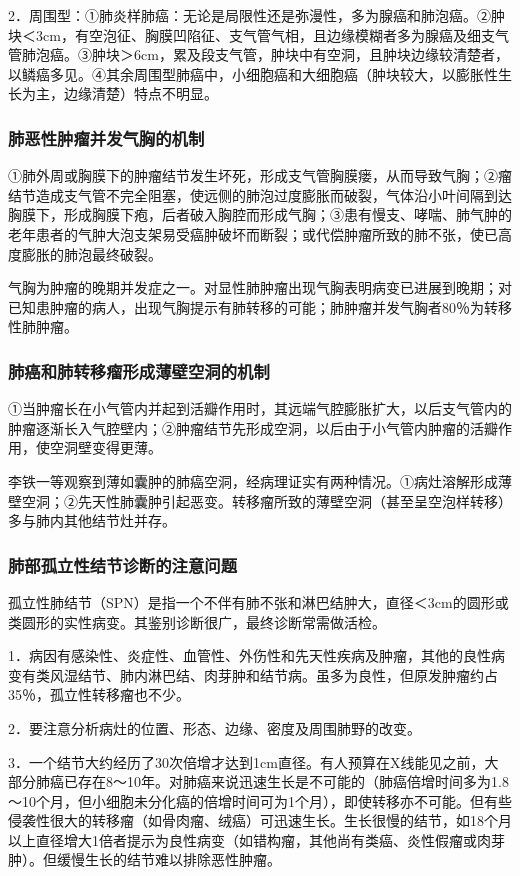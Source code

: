 2．周围型：①肺炎样肺癌：无论是局限性还是弥漫性，多为腺癌和肺泡癌。②肿块＜3cm，有空泡征、胸膜凹陷征、支气管气相，且边缘模糊者多为腺癌及细支气管肺泡癌。③肿块＞6cm，累及段支气管，肿块中有空洞，且肿块边缘较清楚者，以鳞癌多见。④其余周围型肺癌中，小细胞癌和大细胞癌（肿块较大，以膨胀性生长为主，边缘清楚）特点不明显。

\subsubsection{肺恶性肿瘤并发气胸的机制}

①肺外周或胸膜下的肿瘤结节发生坏死，形成支气管胸膜瘘，从而导致气胸；②瘤结节造成支气管不完全阻塞，使远侧的肺泡过度膨胀而破裂，气体沿小叶间隔到达胸膜下，形成胸膜下疱，后者破入胸腔而形成气胸；③患有慢支、哮喘、肺气肿的老年患者的气肿大泡支架易受癌肿破坏而断裂；或代偿肿瘤所致的肺不张，使已高度膨胀的肺泡最终破裂。

气胸为肿瘤的晚期并发症之一。对显性肺肿瘤出现气胸表明病变已进展到晚期；对已知患肿瘤的病人，出现气胸提示有肺转移的可能；肺肿瘤并发气胸者80％为转移性肺肿瘤。

\subsubsection{肺癌和肺转移瘤形成薄壁空洞的机制}

①当肿瘤长在小气管内并起到活瓣作用时，其远端气腔膨胀扩大，以后支气管内的肿瘤逐渐长入气腔壁内；②肿瘤结节先形成空洞，以后由于小气管内肿瘤的活瓣作用，使空洞壁变得更薄。

李铁一等观察到薄如囊肿的肺癌空洞，经病理证实有两种情况。①病灶溶解形成薄壁空洞；②先天性肺囊肿引起恶变。转移瘤所致的薄壁空洞（甚至呈空泡样转移）多与肺内其他结节灶并存。

\subsubsection{肺部孤立性结节诊断的注意问题}

孤立性肺结节（SPN）是指一个不伴有肺不张和淋巴结肿大，直径＜3cm的圆形或类圆形的实性病变。其鉴别诊断很广，最终诊断常需做活检。

1．病因有感染性、炎症性、血管性、外伤性和先天性疾病及肿瘤，其他的良性病变有类风湿结节、肺内淋巴结、肉芽肿和结节病。虽多为良性，但原发肿瘤约占35％，孤立性转移瘤也不少。

2．要注意分析病灶的位置、形态、边缘、密度及周围肺野的改变。

3．一个结节大约经历了30次倍增才达到1cm直径。有人预算在X线能见之前，大部分肺癌已存在8～10年。对肺癌来说迅速生长是不可能的（肺癌倍增时间多为1.8～10个月，但小细胞未分化癌的倍增时间可为1个月），即使转移亦不可能。但有些侵袭性很大的转移瘤（如骨肉瘤、绒癌）可迅速生长。生长很慢的结节，如18个月以上直径增大1倍者提示为良性病变（如错构瘤，其他尚有类癌、炎性假瘤或肉芽肿）。但缓慢生长的结节难以排除恶性肿瘤。

